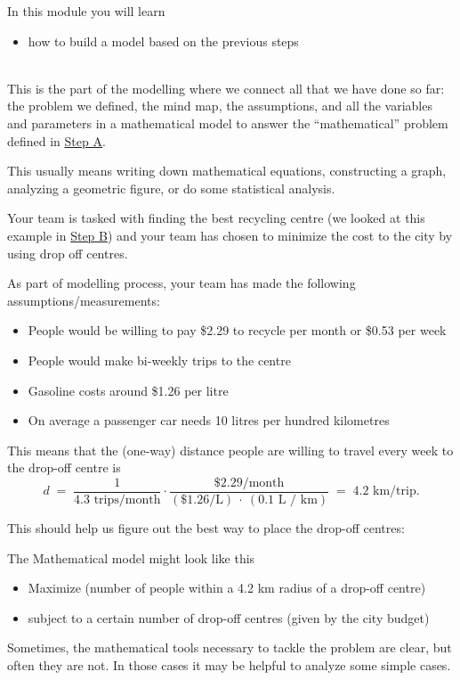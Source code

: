 In this module you will learn
\begin{itemize}
	\item how to build a model based on the previous steps
\end{itemize}

\hfill \\



This is the part of the modelling where we connect all that we have done so far: the problem we defined, the mind map, the assumptions, and all the variables and parameters in a mathematical model to answer the ``mathematical'' problem defined in \hyperref[define]{Step A}.

This usually means writing down mathematical equations, constructing a graph, analyzing a geometric figure, or do some statistical analysis. \\


\begin{example}
Your team is tasked with finding the best recycling centre (we looked at this example in \hyperref[mindmap]{Step B}) and your  team has chosen to minimize the cost to the city by using drop off centres.

As part of modelling process, your team has made the following assumptions/measurements:
\begin{itemize}
	\item People would be willing to pay \$2.29 to recycle per month or \$0.53 per week
	\item People would make bi-weekly trips to the centre
	\item Gasoline costs around \$1.26 per litre
	\item On average a passenger car needs 10 litres per hundred kilometres
\end{itemize}

This means that the (one-way) distance people are willing to travel every week to the drop-off centre is
$$
d \;=\; \frac{1}{4.3 \text{ trips/month}} \cdot \frac{\$2.29 / {\text{month}} }{(\$1.26 \text{/L}) \ \cdot\  (0.1 \text{ L / km})} \;=\; 4.2 \text{  km/trip}.
$$

This should help us figure out the best way to place the drop-off centres:

The Mathematical model might look like this

\begin{itemize}
	\item Maximize (number of people within a 4.2 km radius of a drop-off centre)
	\item subject to a certain number of drop-off centres (given by the city budget)
\end{itemize}

	
\end{example}

\hfill

Sometimes, the mathematical tools necessary to tackle the problem are clear, but often they are not. In those cases it may be helpful to analyze some simple cases.

